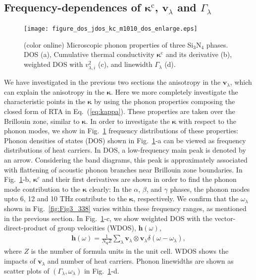 \documentclass[twocolumn,amsmath,amssymb,a4paper,prb,superscriptaddress,floatfix]{revtex4-1}
\begin{document}
\subsection{Frequency-dependences of $\boldsymbol{\kappa}^\text{c}$, $\mathbf{v}$$_\lambda$ and $\Gamma_\lambda$}

\begin{figure}[ht]
 \begin{center}
  \texttt{[image: figure\_dos\_jdos\_kc\_m1010\_dos\_enlarge.eps]}
  \caption{(color online) Microscopic phonon properties of three Si$_3$N$_4$
	  phases. DOS (a), Cumulative thermal conductivity $\mathbf{\kappa}^\text{c}$ and its derivative
	  (b), weighted DOS with $v_{\lambda,i}^2$ (c), and linewidth $\Gamma_\lambda$ (d).
  \label{fig:Fig5_338_rev} }
 \end{center}
\end{figure}

We have investigated in the previous two sections the anisotropy in the
$\mathbf{v}_\lambda$, which can explain the anisotropy in the
$\boldsymbol{\kappa}$. Here we more completely investigate the characteristic
points in the $\boldsymbol{\kappa}$ by using the phonon properties composing
the closed form of RTA in Eq.~(\ref{eq:kappa}). These properties are taken over
the Brillouin zone, similar to $\boldsymbol{\kappa}$.  In order to investigate
the $\boldsymbol{\kappa}$ with respect to the phonon modes, we show in
Fig.~\ref{fig:Fig5_338_rev} frequency distributions of these properties: Phonon
densities of states (DOS) shown in Fig.~\ref{fig:Fig5_338_rev}-a
can be viewed as frequency distributions of heat carriers.  In DOS, a
low-frequency main peak is denoted by an arrow. Considering the band diagrams,
this peak is approximately associated with flattening of acoustic phonon
branches near Brillouin zone boundaries.  In Fig.~\ref{fig:Fig5_338_rev}-b,
$\boldsymbol{\kappa}^c$ and their first derivatives are shown in order to find
the phonon mode contribution to the $\boldsymbol{\kappa}$ clearly: In the
$\alpha$, $\beta$, and $\gamma$ phases, the phonon modes upto 6, 12 and 10 THz
contribute to the $\boldsymbol{\kappa}$, respectively.  We confirm that the
$\omega_\lambda$ shown in Fig.~\ref{fig:Fig3_338} varies within these frequency
ranges, as mentioned in the previous section.  In Fig.~\ref{fig:Fig5_338_rev}-c,
we show weighted DOS with the vector-direct-product of group velocities (WDOS),
$\boldsymbol{h}(\omega)$,
\begin{align}
 \label{eq:wdos}
 \boldsymbol{h}(\omega) = \frac{1}{N_\mathbf{q}Z}
 \sum_\lambda
 \mathbf{v}_\lambda \otimes \mathbf{v}_\lambda
 \delta(\omega-\omega_{\lambda}),
\end{align}
where $Z$ is the number of formula units in the unit cell. WDOS shows the
impacts of $\mathbf{v}_\lambda$ and number of heat carriers.  Phonon linewidths
are shown as scatter plots of
$(\Gamma_\lambda, \omega_\lambda)$ in Fig.~\ref{fig:Fig5_338_rev}-d. 
\end{document}
